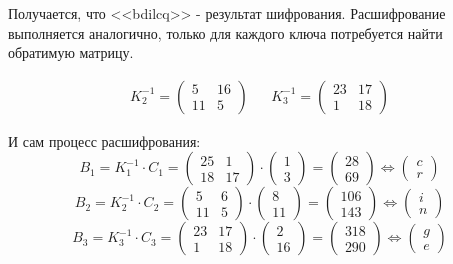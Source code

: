 \documentclass[a4paper]{article}
\begin{document}
  Получается, что <<bdilcq>> - результат шифрования. Расшифрование выполняется аналогично,
  только для каждого ключа потребуется найти обратимую матрицу.

  \begin{align}
    K^{-1}_2 = \begin{pmatrix}
        5 & 16 \\ 11 & 5
    \end{pmatrix} &&
    K^{-1}_3 = \begin{pmatrix}
        23 & 17 \\ 1 & 18
    \end{pmatrix}
  \end{align}

  И сам процесс расшифрования:
  \begin{equation}
    B_1 = K^{-1}_1\cdot C_1 = \begin{pmatrix}
        25 & 1 \\ 18 & 17
    \end{pmatrix} \cdot \begin{pmatrix}
        1 \\ 3
    \end{pmatrix} = \begin{pmatrix}
        28 \\ 69
    \end{pmatrix} \Leftrightarrow \begin{pmatrix}
        c \\ r
    \end{pmatrix}
  \end{equation}
  \begin{equation}
    B_2 = K^{-1}_2\cdot C_2 = \begin{pmatrix}
        5 & 6 \\ 11 & 5
    \end{pmatrix} \cdot \begin{pmatrix}
        8 \\ 11
    \end{pmatrix} = \begin{pmatrix}
        106 \\ 143
    \end{pmatrix} \Leftrightarrow \begin{pmatrix}
        i \\ n
    \end{pmatrix}
  \end{equation}
  \begin{equation}
    B_3 = K^{-1}_3\cdot C_3 = \begin{pmatrix}
        23 & 17 \\ 1 & 18
    \end{pmatrix} \cdot \begin{pmatrix}
        2 \\ 16
    \end{pmatrix} = \begin{pmatrix}
        318 \\ 290
    \end{pmatrix} \Leftrightarrow \begin{pmatrix}
        g \\ e
    \end{pmatrix}
  \end{equation}
\end{document}
